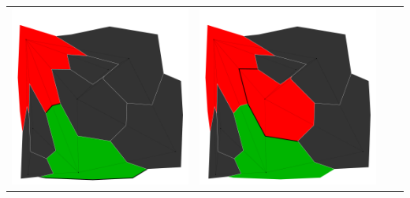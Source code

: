 \documentclass[10pt,a4paper]{article}
\begin{document}
\begin{tabular}{c c c c }
	\includegraphics[scale=.10]{../results/backtracking_simple/map_build/bt_simple_I00003.pdf}&
	\includegraphics[scale=.10]{../results/backtracking_simple/map_build/bt_simple_I00004.pdf}\\
	

\end{tabular}
\end{document}
